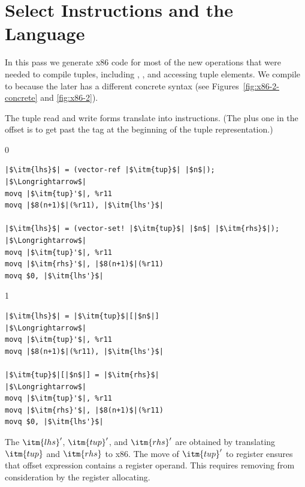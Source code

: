 \documentclass[7x10]{TimesAPriori_MIT}%
\def\racketEd{0}
\def\pythonEd{1}
\def\edition{1}
\begin{document}
\section{Select Instructions and the \LangXGlobal{} Language}
\label{sec:select-instructions-gc}


In this pass we generate x86 code for most of the new operations that
were needed to compile tuples, including ,
, and accessing tuple elements.
%
We compile  to  because the later has a
different concrete syntax (see Figures~\ref{fig:x86-2-concrete} and
\ref{fig:x86-2}).  

The tuple read and write forms translate into 
instructions.  (The plus one in the offset is to get past the tag at
the beginning of the tuple representation.)
%
\begin{center}
\begin{minipage}{\textwidth}
{\if\edition\racketEd    
\begin{lstlisting}
|$\itm{lhs}$| = (vector-ref |$\itm{tup}$| |$n$|);
|$\Longrightarrow$|
movq |$\itm{tup}'$|, %r11
movq |$8(n+1)$|(%r11), |$\itm{lhs'}$|

|$\itm{lhs}$| = (vector-set! |$\itm{tup}$| |$n$| |$\itm{rhs}$|);
|$\Longrightarrow$|
movq |$\itm{tup}'$|, %r11
movq |$\itm{rhs}'$|, |$8(n+1)$|(%r11)
movq $0, |$\itm{lhs'}$|
\end{lstlisting}
\fi}
{\if\edition\pythonEd    
\begin{lstlisting}
|$\itm{lhs}$| = |$\itm{tup}$|[|$n$|]
|$\Longrightarrow$|
movq |$\itm{tup}'$|, %r11
movq |$8(n+1)$|(%r11), |$\itm{lhs'}$|

|$\itm{tup}$|[|$n$|] = |$\itm{rhs}$|
|$\Longrightarrow$|
movq |$\itm{tup}'$|, %r11
movq |$\itm{rhs}'$|, |$8(n+1)$|(%r11)
movq $0, |$\itm{lhs'}$|
\end{lstlisting}
\fi}
\end{minipage}
\end{center}
The $\itm{lhs}'$, $\itm{tup}'$, and $\itm{rhs}'$ are obtained by
translating $\itm{tup}$ and $\itm{rhs}$ to x86.  The move of $\itm{tup}'$ to
register  ensures that offset expression
 contains a register operand.  This requires
removing  from consideration by the register allocating.
\end{document}
